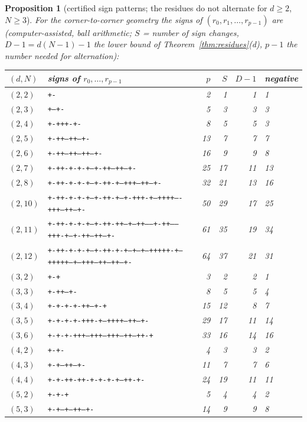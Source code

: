 \documentclass[11pt,a4paper]{article}
\theoremstyle{plain}
\newtheorem{proposition}[theorem]{Proposition}
\theoremstyle{definition}
\numberwithin{equation}{section}
\begin{document}
\begin{proposition}[certified sign patterns; the residues do not alternate for $d\ge2$, $N\ge3$]\label{prop:signs}
For the corner-to-corner geometry the signs of $(r_0,r_1,\dots,r_{p-1})$ are (computer-assisted, ball arithmetic; $S$ = number of sign changes, $D-1=d(N-1)-1$ the lower bound of Theorem~\ref{thm:residues}(d), $p-1$ the number needed for alternation):
\begin{center}\footnotesize
\begin{tabular}{llrrrl}
$(d,N)$ & signs of $r_0,\dots,r_{p-1}$ & $p$ & $S$ & $D-1$ & negative\\\hline
$(2,2)$ & \texttt{+-} & 2 & 1 & 1 & 1\\
$(2,3)$ & \texttt{+--+-} & 5 & 3 & 3 & 3\\
$(2,4)$ & \texttt{+-+++-+-} & 8 & 5 & 5 & 3\\
$(2,5)$ & \texttt{+-++---++--+-} & 13 & 7 & 7 & 7\\
$(2,6)$ & \texttt{+-++--++--++--+-} & 16 & 9 & 9 & 8\\
$(2,7)$ & \texttt{+-++-+-+-+--+-++---++--+-} & 25 & 17 & 11 & 13\\
$(2,8)$ & \texttt{+-++-+-+-+--+-++-+--+++---++--+-} & 32 & 21 & 13 & 16\\
$(2,10)$ & \texttt{+-++-+-+-+--+-++-+---+-+++-+--++++----+++---++--+-} & 50 & 29 & 17 & 25\\
$(2,11)$ & \texttt{+-++-+-+-+--+-++-++--+--++------+-++-----+++-+--+-++---++--+-} & 61 & 35 & 19 & 34\\
$(2,12)$ & \texttt{+-++-+-+-+--+-++-+-+--+--+--+++++-+--+++++--+--+++---++---++--+-} & 64 & 37 & 21 & 31\\
$(3,2)$ & \texttt{+-+} & 3 & 2 & 2 & 1\\
$(3,3)$ & \texttt{+-++--+-} & 8 & 5 & 5 & 4\\
$(3,4)$ & \texttt{+-+-+-+-++--+-+} & 15 & 12 & 8 & 7\\
$(3,5)$ & \texttt{+-+-+-+-+++-+---++++---++--+-} & 29 & 17 & 11 & 14\\
$(3,6)$ & \texttt{+-+-+-+++---+++---+++---++---++-+} & 33 & 16 & 14 & 16\\
$(4,2)$ & \texttt{+-+-} & 4 & 3 & 3 & 2\\
$(4,3)$ & \texttt{+-+--++--+-} & 11 & 7 & 7 & 6\\
$(4,4)$ & \texttt{+-+-++-++-+-+-+-+--++-+-} & 24 & 19 & 11 & 11\\
$(5,2)$ & \texttt{+-+-+} & 5 & 4 & 4 & 2\\
$(5,3)$ & \texttt{+-+--+--++--+-} & 14 & 9 & 9 & 8

\end{tabular}
\end{center}
\end{proposition}
\end{document}
